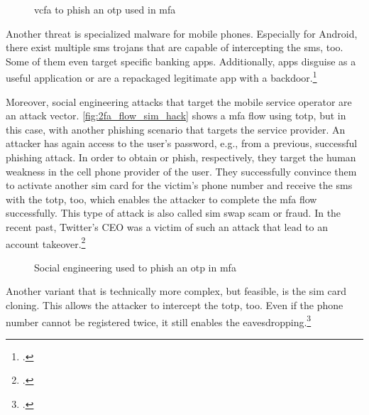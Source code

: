 \begin{figure}[hbt]
	\centering
	
	\caption[\gls{vcfa} to phish an \gls{otp} used in \gls{mfa}]{\gls{vcfa} to phish an \gls{otp} used in \gls{mfa}\footnotemark}
	\label{fig:2fa_flow_forward_phishing}
\end{figure}

Another threat is specialized malware for mobile phones. Especially for Android, there exist multiple \gls{sms} trojans that are capable of intercepting the \gls{sms}, too. Some of them even target specific banking apps. Additionally, apps disguise as a useful application or are a repackaged legitimate app with a backdoor.\footcites[See][146--149]{dmitrienko2014security}[See][152--154]{10.1007/978-3-642-39235-1_9}[See][114]{HAMED2017109}[See][]{eset-bypass2fa}

\newpage

Moreover, social engineering attacks that target the mobile service operator are an attack vector. \autoref{fig:2fa_flow_sim_hack} shows a \gls{mfa} flow using \gls{totp}, but in this case, with another phishing scenario that targets the service provider. An attacker has again access to the user's password, e.g., from a previous, successful phishing attack. In order to obtain or phish, respectively, they target the human weakness in the cell phone provider of the user. They successfully convince them to activate another \gls{sim} card for the victim's phone number and receive the \gls{sms} with the \gls{totp}, too, which enables the attacker to complete the \gls{mfa} flow successfully. This type of attack is also called \gls{sim} swap scam or fraud. In the recent past, Twitter's CEO was a victim of such an attack that lead to an account takeover.\footcites[See][19]{BLAICH201719}[See][]{twitter-hack}[See][74--76]{10.1007/978-3-642-19228-9_7}
\\
\begin{figure}[hbt]
	\centering
	
	\caption[Social engineering used to phish an \gls{otp} in \gls{mfa}]{Social engineering used to phish an \gls{otp} in \gls{mfa}\footnotemark}
	\label{fig:2fa_flow_sim_hack}
\end{figure}

Another variant that is technically more complex, but feasible, is the \gls{sim} card cloning. This allows the attacker to intercept the \gls{totp}, too. Even if the phone number cannot be registered twice, it still enables the eavesdropping.\footcites[See][873]{eckert-it-sec-9}[See][11--12]{sim-clone}

